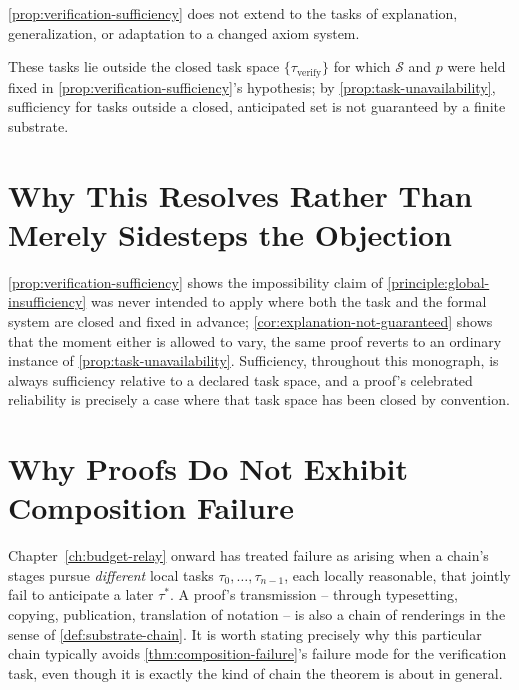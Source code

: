 \begin{corollary}
\label{cor:explanation-not-guaranteed}
\cref{prop:verification-sufficiency} does not extend to the tasks of
explanation, generalization, or adaptation to a changed axiom system.
\end{corollary}

\begin{proofsketch}
These tasks lie outside the closed task space $\{\tau_{\text{verify}}\}$
for which $\mathcal{S}$ and $p$ were held fixed in
\cref{prop:verification-sufficiency}'s hypothesis; by
\cref{prop:task-unavailability}, sufficiency for tasks outside a closed,
anticipated set is not guaranteed by a finite substrate.
\end{proofsketch}

\section{Why This Resolves Rather Than Merely Sidesteps the Objection}

\cref{prop:verification-sufficiency} shows the impossibility claim of
\cref{principle:global-insufficiency} was never intended to apply where
both the task and the formal system are closed and fixed in advance;
\cref{cor:explanation-not-guaranteed} shows that the moment either is
allowed to vary, the same proof reverts to an ordinary instance of
\cref{prop:task-unavailability}. Sufficiency, throughout this monograph,
is always sufficiency relative to a declared task space, and a proof's
celebrated reliability is precisely a case where that task space has been
closed by convention.

\section{Why Proofs Do Not Exhibit Composition Failure}

Chapter~\ref{ch:budget-relay} onward has treated failure as arising when
a chain's stages pursue \emph{different} local tasks $\tau_0, \ldots,
\tau_{n-1}$, each locally reasonable, that jointly fail to anticipate a
later $\tau^*$. A proof's transmission -- through typesetting, copying,
publication, translation of notation -- is also a chain of renderings in
the sense of \cref{def:substrate-chain}. It is worth stating precisely
why this particular chain typically avoids
\cref{thm:composition-failure}'s failure mode for the verification task,
even though it is exactly the kind of chain the theorem is about in
general.

